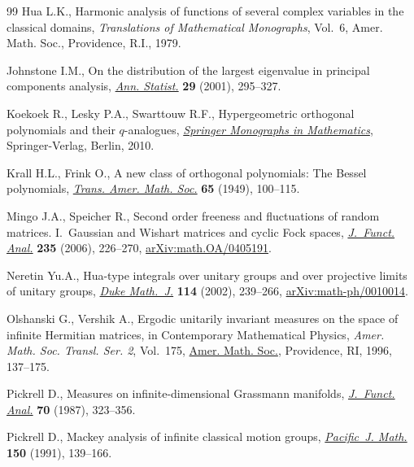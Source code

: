 \documentclass[pdftex]{sigma}
\numberwithin{equation}{section}
\begin{document}
\begin{thebibliography}{99}
Hua L.K., Harmonic analysis of functions of several complex variables in the
 classical domains, \textit{Translations of Mathematical Monographs}, Vol.~6,
 Amer. Math. Soc., Providence, R.I., 1979.

Johnstone I.M., On the distribution of the largest eigenvalue in principal
 components analysis, \href{https://doi.org/10.1214/aos/1009210544}{\textit{Ann. Statist.}} \textbf{29} (2001), 295--327.

Koekoek R., Lesky P.A., Swarttouw R.F., Hypergeometric orthogonal polynomials
 and their {$q$}-analogues, \href{https://doi.org/10.1007/978-3-642-05014-5}{\textit{Springer Monographs in Mathematics}},
 Springer-Verlag, Berlin, 2010.

Krall H.L., Frink O., A new class of orthogonal polynomials: {T}he {B}essel
 polynomials, \href{https://doi.org/10.2307/1990516}{\textit{Trans. Amer. Math. Soc.}} \textbf{65} (1949), 100--115.

Mingo J.A., Speicher R., Second order freeness and fluctuations of random
 matrices. {I}.~{G}aussian and {W}ishart matrices and cyclic {F}ock spaces,
 \href{https://doi.org/10.1016/j.jfa.2005.10.007}{\textit{J.~Funct. Anal.}} \textbf{235} (2006), 226--270,
 \href{https://arxiv.org/abs/math.OA/0405191}{arXiv:math.OA/0405191}.

Neretin Yu.A., Hua-type integrals over unitary groups and over projective limits
 of unitary groups, \href{https://doi.org/10.1215/S0012-7094-02-11423-9}{\textit{Duke Math.~J.}} \textbf{114} (2002), 239--266,
 \href{https://arxiv.org/abs/math-ph/0010014}{arXiv:math-ph/0010014}.

Olshanski G., Vershik A., Ergodic unitarily invariant measures on the space of
 infinite {H}ermitian matrices, in Contemporary Mathematical Physics,
 \textit{Amer. Math. Soc. Transl. Ser. 2}, Vol.~175, \href{https://doi.org/10.1090/trans2/175/09}{Amer. Math. Soc.},
 Providence, RI, 1996, 137--175.

Pickrell D., Measures on infinite-dimensional {G}rassmann manifolds,
 \href{https://doi.org/10.1016/0022-1236(87)90116-9}{\textit{J.~Funct. Anal.}} \textbf{70} (1987), 323--356.

Pickrell D., Mackey analysis of infinite classical motion groups,
 \href{https://doi.org/10.2140/pjm.1991.150.139}{\textit{Pacific~J. Math.}} \textbf{150} (1991), 139--166.


\end{thebibliography}
\end{document}
